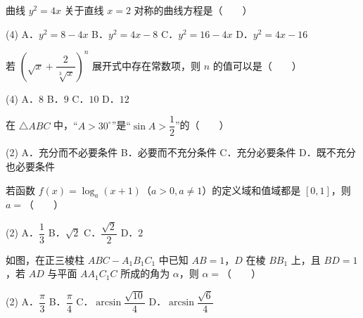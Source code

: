 \begin{question}
曲线 $y^2 = 4x$ 关于直线 $x = 2$ 对称的曲线方程是\mbox{（　　）}

\begin{gkopts}(4)
\task A．$y^2 = 8 - 4x$
\task B．$y^2 = 4x - 8$
\task C．$y^2 = 16 - 4x$
\task D．$y^2 = 4x - 16$
\end{gkopts}

\end{question}
\begin{question}
若 $\left(\sqrt{x} + \dfrac{2}{\sqrt[3]{x}}\right)^n$ 展开式中存在常数项，则 $n$ 的值可以是\mbox{（　　）}

\begin{gkopts}(4)
\task A．$8$
\task B．$9$
\task C．$10$
\task D．$12$
\end{gkopts}

\end{question}
\begin{question}
在 $\triangle ABC$ 中，“$A > 30^\circ$”是“$\sin A > \dfrac{1}{2}$”的\mbox{（　　）}

\begin{gkopts}(2)
\task A．充分而不必要条件
\task B．必要而不充分条件
\task C．充分必要条件
\task D．既不充分也必要条件
\end{gkopts}

\end{question}
\begin{question}
若函数 $f(x) = \log_a (x + 1)$（$a > 0, a \neq 1$）的定义域和值域都是 $[0, 1]$，则 $a =$\mbox{（　　）}

\begin{gkopts}(2)
\task A．$\dfrac{1}{3}$
\task B．$\sqrt{2}$
\task C．$\dfrac{\sqrt{2}}{2}$
\task D．$2$
\end{gkopts}

\Needspace{0.4\textheight}
\end{question}
\begin{question}
如图，在正三棱柱 $ABC - A_1B_1C_1$ 中已知 $AB = 1$，$D$ 在棱 $BB_1$ 上，且 $BD = 1$，若 $AD$ 与平面 $AA_1C_1C$ 所成的角为 $\alpha$，则 $\alpha =$\mbox{（　　）}

\begin{gkopts}(2)
\task A．$\dfrac{\pi}{3}$
\task B．$\dfrac{\pi}{4}$
\task C．$\arcsin\dfrac{\sqrt{10}}{4}$
\task D．$\arcsin\dfrac{\sqrt{6}}{4}$
\end{gkopts}
\nopagebreak[4]
\begin{center}\end{center}
\nopagebreak[4]
\end{question}
